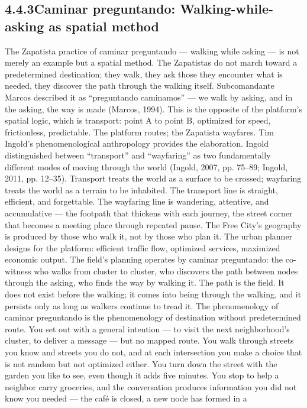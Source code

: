 \subsection{4.4.3\quad Caminar preguntando: Walking-while-asking as spatial method}

The Zapatista practice of caminar preguntando — walking while asking — is not merely an example but a spatial method. The Zapatistas do not march toward a predetermined destination; they walk, they ask those they encounter what is needed, they discover the path through the walking itself. Subcomandante Marcos described it as “preguntando caminamos” — we walk by asking, and in the asking, the way is made (Marcos, 1994). This is the opposite of the platform’s spatial logic, which is transport: point A to point B, optimized for speed, frictionless, predictable. The platform routes; the Zapatista wayfares. Tim Ingold’s phenomenological anthropology provides the elaboration. Ingold distinguished between “transport” and “wayfaring” as two fundamentally different modes of moving through the world (Ingold, 2007, pp. 75–89; Ingold, 2011, pp. 12–35). Transport treats the world as a surface to be crossed; wayfaring treats the world as a terrain to be inhabited. The transport line is straight, efficient, and forgettable. The wayfaring line is wandering, attentive, and accumulative — the footpath that thickens with each journey, the street corner that becomes a meeting place through repeated pause. The Free City’s geography is produced by those who walk it, not by those who plan it. The urban planner designs for the platform: efficient traffic flow, optimized services, maximized economic output. The field’s planning operates by caminar preguntando: the co-witness who walks from cluster to cluster, who discovers the path between nodes through the asking, who finds the way by walking it. The path is the field. It does not exist before the walking; it comes into being through the walking, and it persists only as long as walkers continue to tread it. The phenomenology of caminar preguntando is the phenomenology of destination without predetermined route. You set out with a general intention — to visit the next neighborhood’s cluster, to deliver a message — but no mapped route. You walk through streets you know and streets you do not, and at each intersection you make a choice that is not random but not optimized either. You turn down the street with the garden you like to see, even though it adds five minutes. You stop to help a neighbor carry groceries, and the conversation produces information you did not know you needed — the café is closed, a new node has formed in a

